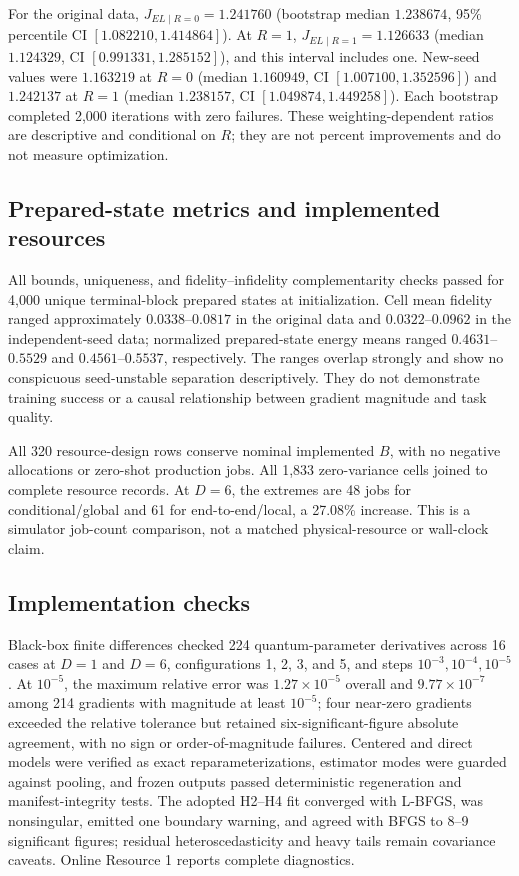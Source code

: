 \documentclass[pdflatex,sn-mathphys-num,Numbered]{sn-jnl}
\begin{document}
For the original data, $J_{EL\mid R=0}=1.241760$ (bootstrap median $1.238674$, 95\% percentile CI $[1.082210,1.414864]$). At $R=1$, $J_{EL\mid R=1}=1.126633$ (median $1.124329$, CI $[0.991331,1.285152]$), and this interval includes one. New-seed values were $1.163219$ at $R=0$ (median $1.160949$, CI $[1.007100,1.352596]$) and $1.242137$ at $R=1$ (median $1.238157$, CI $[1.049874,1.449258]$). Each bootstrap completed 2,000 iterations with zero failures. These weighting-dependent ratios are descriptive and conditional on $R$; they are not percent improvements and do not measure optimization.

\subsection{Prepared-state metrics and implemented resources}

All bounds, uniqueness, and fidelity--infidelity complementarity checks passed for 4,000 unique terminal-block prepared states at initialization. Cell mean fidelity ranged approximately $0.0338$--$0.0817$ in the original data and $0.0322$--$0.0962$ in the independent-seed data; normalized prepared-state energy means ranged $0.4631$--$0.5529$ and $0.4561$--$0.5537$, respectively. The ranges overlap strongly and show no conspicuous seed-unstable separation descriptively. They do not demonstrate training success or a causal relationship between gradient magnitude and task quality.

All 320 resource-design rows conserve nominal implemented $B$, with no negative allocations or zero-shot production jobs. All 1,833 zero-variance cells joined to complete resource records. At $D=6$, the extremes are 48 jobs for conditional/global and 61 for end-to-end/local, a 27.08\% increase. This is a simulator job-count comparison, not a matched physical-resource or wall-clock claim.

\subsection{Implementation checks}\label{sec:results-robustness}

Black-box finite differences checked 224 quantum-parameter derivatives across 16 cases at $D=1$ and $D=6$, configurations 1, 2, 3, and 5, and steps $10^{-3},10^{-4},10^{-5}$. At $10^{-5}$, the maximum relative error was $1.27\times10^{-5}$ overall and $9.77\times10^{-7}$ among 214 gradients with magnitude at least $10^{-5}$; four near-zero gradients exceeded the relative tolerance but retained six-significant-figure absolute agreement, with no sign or order-of-magnitude failures. Centered and direct models were verified as exact reparameterizations, estimator modes were guarded against pooling, and frozen outputs passed deterministic regeneration and manifest-integrity tests. The adopted H2--H4 fit converged with L-BFGS, was nonsingular, emitted one boundary warning, and agreed with BFGS to 8--9 significant figures; residual heteroscedasticity and heavy tails remain covariance caveats. Online Resource 1 reports complete diagnostics.
\end{document}
